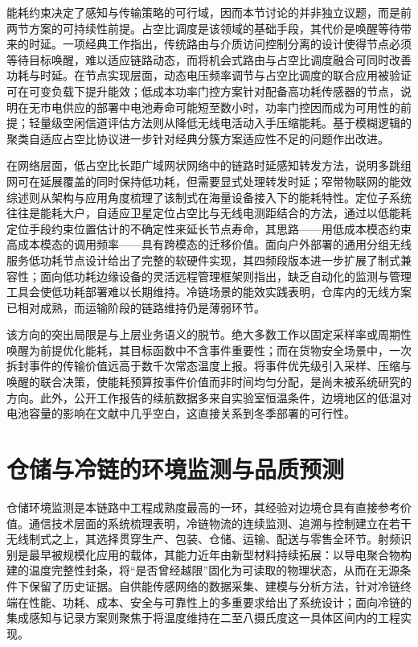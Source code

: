 \documentclass[11pt,a4paper]{article}
\begin{document}
能耗约束决定了感知与传输策略的可行域，因而本节讨论的并非独立议题，而是前两节方案的可持续性前提。占空比调度是该领域的基础手段，其代价是唤醒等待带来的时延。一项经典工作指出，传统路由与介质访问控制分离的设计使得节点必须等待目标唤醒，难以适应链路动态，而将机会式路由与占空比调度融合可同时改善功耗与时延\cite{doiipsn20126920956}。在节点实现层面，动态电压频率调节与占空比调度的联合应用被验证可在可变负载下提升能效\cite{doielectronics11244071}；低成本功率门控方案针对配备高功耗传感器的节点，说明在无市电供应的部署中电池寿命可能短至数小时，功率门控因而成为可用性的前提\cite{doiietwss20185124}；轻量级空闲信道评估方法则从降低无线电活动入手压缩能耗\cite{doipreprints2019120126v1}。基于模糊逻辑的聚类自适应占空比协议进一步针对经典分簇方案适应性不足的问题作出改进\cite{doiijarsct28470}。

在网络层面，低占空比长距广域网状网络中的链路时延感知转发方法，说明多跳组网可在延展覆盖的同时保持低功耗，但需要显式处理转发时延\cite{doiijsnet202410067288}；窄带物联网的能效综述则从架构与应用角度梳理了该制式在海量设备接入下的能耗特性\cite{doiaccess20182881533}。定位子系统往往是能耗大户，自适应卫星定位占空比与无线电测距结合的方法，通过以低能耗定位手段约束位置估计的不确定性来延长节点寿命，其思路——用低成本模态约束高成本模态的调用频率——具有跨模态的迁移价值\cite{doi18699831869990}。面向户外部署的通用分组无线服务低功耗节点设计给出了完整的软硬件实现\cite{doitechrxiv21733358v1}，其四频段版本进一步扩展了制式兼容性\cite{doitechrxiv21733358}；面向低功耗边缘设备的灵活远程管理框架则指出，缺乏自动化的监测与管理工具会使低功耗部署难以长期维持\cite{doitechrxiv1714411155556212}。冷链场景的能效实践表明，仓库内的无线方案已相对成熟，而运输阶段的链路维持仍是薄弱环节\cite{doiccnc20094784847}。

该方向的突出局限是与上层业务语义的脱节。绝大多数工作以固定采样率或周期性唤醒为前提优化能耗，其目标函数中不含事件重要性；而在货物安全场景中，一次拆封事件的传输价值远高于数千次常态温度上报。将事件优先级引入采样、压缩与唤醒的联合决策，使能耗预算按事件价值而非时间均匀分配，是尚未被系统研究的方向。此外，公开工作报告的续航数据多来自实验室恒温条件，边境地区的低温对电池容量的影响在文献中几乎空白，这直接关系到冬季部署的可行性。

\section{仓储与冷链的环境监测与品质预测}

仓储环境监测是本链路中工程成熟度最高的一环，其经验对边境仓具有直接参考价值。通信技术层面的系统梳理表明，冷链物流的连续监测、追溯与控制建立在若干无线制式之上，其选择贯穿生产、包装、仓储、运输、配送与零售全环节\cite{doiaccess20263712272}。射频识别是最早被规模化应用的载体\cite{doi8006}，其能力近年由新型材料持续拓展：以导电聚合物构建的温度完整性封条，将“是否曾经越限”固化为可读取的物理状态，从而在无源条件下保留了历史证据\cite{doiapsincusncursi5205420241}。自供能传感网络的数据采集、建模与分析方法，针对冷链终端在性能、功耗、成本、安全与可靠性上的多重要求给出了系统设计\cite{doijsen20233242618}；面向冷链的集成感知与记录方案则聚焦于将温度维持在二至八摄氏度这一具体区间内的工程实现\cite{doijrfid20243488534}。
\end{document}
